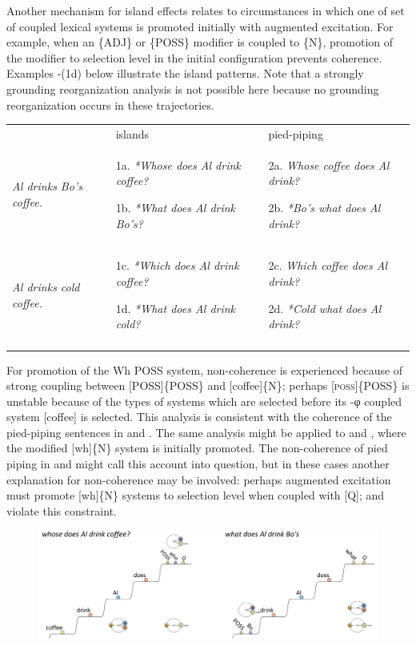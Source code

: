 Another mechanism for island effects relates to circumstances in which one of set of coupled lexical systems is promoted initially with augmented excitation. For example, when an \{ADJ\} or \{POSS\} modifier is coupled to \{N\}, promotion of the modifier to selection level in the initial configuration prevents coherence. Examples -(1d) below illustrate the island patterns. Note that a strongly grounding reorganization analysis is not possible here because no grounding reorganization occurs in these trajectories.

\begin{tabularx}{\textwidth}{XXX} & islands & pied-piping\\
\lsptoprule
\textit{Al drinks Bo’s coffee.} & 1a.  \textit{*Whose does Al drink coffee?}

1b.  \textit{*What does Al drink Bo’s?} & 2a.  \textit{Whose coffee does Al drink?}

2b.  \textit{*Bo’s what does Al drink?}\\
\textit{Al drinks cold coffee.} & 1c.  \textit{*Which does Al drink coffee?}

1d.  \textit{*What does Al drink cold?} & 2c.  \textit{Which coffee does Al drink?}

2d.  \textit{*Cold what does Al drink?}\\
\lspbottomrule
\end{tabularx}
  For promotion of the {\textbar}Wh POSS{\textbar} system, non-coherence is experienced because of strong coupling between [POSS]\{POSS\} and [coffee]\{N\}; perhaps [\textsc{poss}]\{POSS\} is unstable because of the types of systems which are selected before its -φ coupled system [coffee] is selected. This analysis is consistent with the coherence of the pied-piping sentences in  and . The same analysis might be applied to  and , where the modified [wh]\{N\} system is initially promoted. The non-coherence of pied piping in  and  might call this account into question, but in these cases another explanation for non-coherence may be involved: perhaps augmented excitation must promote [wh]\{N\} systems to selection level when coupled with [Q];  and  violate this constraint. 

  
\begin{figure}
\includegraphics[width=\textwidth]{figures/Tilsen-img166.png}
\caption{\missingcaption}
\label{fig:}
\end{figure}
 

